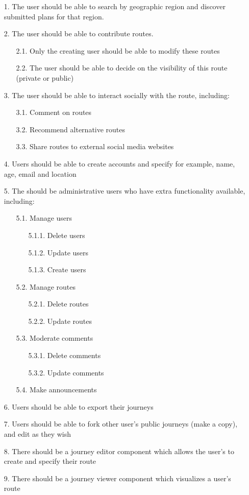 \documentclass[a4paper,twoside,notitlepage,11pt]{article}
\begin{document}
 \begin{enumerate}
 \item[1.] The user should be able to search by geographic region and discover submitted plans for that region.
 \item[2.] The user should be able to contribute routes.
 	\begin{enumerate}
 	\item[2.1.] Only the creating user should be able to modify these routes
 	\item[2.2.] The user should be able to decide on the visibility of this route (private or public)
 	\end{enumerate}
 \item[3.] The user should be able to interact socially with the route, including:
 	\begin{enumerate}
 	\item[3.1.] Comment on routes
 	\item[3.2.] Recommend alternative routes
 	\item[3.3.] Share routes to external social media websites
 	\end{enumerate}
 \item[4.] Users should be able to create accounts and specify for example, name, age, email and location 
 \item[5.] The should be administrative users who have extra functionality available, including:
	 \begin{enumerate}
 		\item[5.1.] Manage users
 		\begin{enumerate}
 			\item[5.1.1.] Delete users
 			\item[5.1.2.] Update users
 			\item[5.1.3.] Create users
 		\end{enumerate}
 		\item[5.2.] Manage routes
 		\begin{enumerate}
 			\item[5.2.1.] Delete routes
 			\item[5.2.2.] Update routes
 		\end{enumerate}
 		\item[5.3.] Moderate comments
 		\begin{enumerate}
 			\item[5.3.1.] Delete comments
			\item[5.3.2.] Update comments
 		\end{enumerate}
 		\item[5.4.] Make announcements
 	\end{enumerate}
 \item[6.] Users should be able to export their journeys
 \item[7.] Users should be able to fork other user's public journeys (make a copy), and edit as they wish
 \item[8.] There should be a journey editor component which allows the user's to create and specify their route
 \item[9.] There should be a journey viewer component which visualizes a user's route
 \end{enumerate}
 
\end{document}
